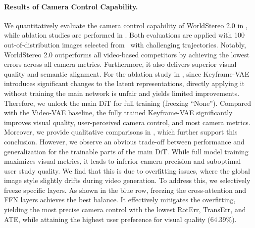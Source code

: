 \documentclass{article} %
\begin{document}
\paragraph{Results of Camera Control Capability.}
We quantitatively evaluate the camera control capability of WorldStereo 2.0 in , while ablation studies are performed in . Both evaluations are applied with 100 out-of-distribution images selected from~\cite{duan2025worldscore} with challenging trajectories.
Notably, WorldStereo 2.0 outperforms all video-based competitors by achieving the lowest errors across all camera metrics. Furthermore, it also delivers superior visual quality and semantic alignment. 
For the ablation study in , since Keyframe-VAE introduces significant changes to the latent representations, directly applying it without training the main network is unfair and yields limited improvements. Therefore, we unlock the main DiT for full training (freezing ``None'').
Compared with the Video-VAE baseline, the fully trained Keyframe-VAE significantly improves visual quality, user-perceived camera control, and most camera metrics.
Moreover, we provide qualitative comparisons in , which further support this conclusion.
However, we observe an obvious trade-off between performance and generalization for the trainable parts of the main DiT.
While full model training maximizes visual metrics, it leads to inferior camera precision and suboptimal user study quality.
We find that this is due to overfitting issues, where the global image style slightly drifts during video generation. To address this, we selectively freeze specific layers. As shown in the blue row, freezing the cross-attention and FFN layers achieves the best balance.
It effectively mitigates the overfitting, yielding the most precise camera control with the lowest RotErr, TransErr, and ATE, while attaining the highest user preference for visual quality (64.39\%).
\end{document}
